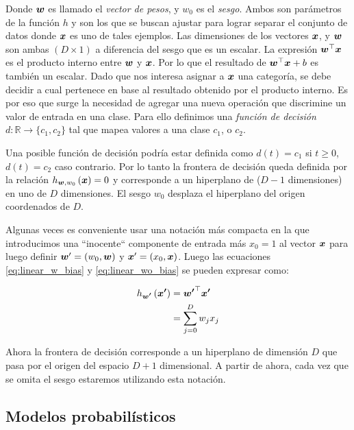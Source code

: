 Donde $\boldsymbol{w}$ es llamado el \emph{vector de pesos}, y $w_0$ es el
\emph{sesgo}. Ambos son parámetros de la función $h$ y son los que se buscan
ajustar para lograr separar el conjunto de datos donde $\boldsymbol{x}$ es uno de tales
ejemplos. Las dimensiones de los vectores $\boldsymbol{x}$, y $\boldsymbol{w}$ son ambas $(D
\times 1)$ a diferencia del sesgo que es un escalar. La expresión
$\boldsymbol{w}^{\top} \boldsymbol{x}$ es el producto interno entre $\boldsymbol{w}$ y $\boldsymbol{x}$.
Por lo que el resultado de $\boldsymbol{w}^{\top} \boldsymbol{x} + b$ es también un escalar.
Dado que nos interesa asignar a $\boldsymbol{x}$ una categoría, se debe decidir a cual
pertenece en base al resultado obtenido por el producto interno. Es por eso que
surge la necesidad de agregar una nueva operación que discrimine un valor de
entrada en una clase. Para ello definimos una \emph{función de decisión} $d: \mathbb{R} \rightarrow
\{c_1, c_2\}$ tal que mapea valores a una clase $c_1$, o $c_2$.

Una posible función de decisión podría estar definida como $d(t) = c_1$ si $t
\geq 0$, $d(t) = c_2$ caso contrario. Por lo tanto la frontera de decisión queda
definida por la relación $h_{\boldsymbol{w}, w_0}\left( \boldsymbol{x} \right) = 0$ y
corresponde a un hiperplano de ($D-1$ dimensiones) en uno de $D$ dimensiones. El
sesgo $w_0$ desplaza el hiperplano del origen coordenados de $D$.

Algunas veces es conveniente usar una notación más compacta en la que
introducimos una ``inocente`` componente de entrada más $x_0 = 1$ al vector
$\boldsymbol{x}$ para luego definir $\boldsymbol{w}' = (w_0, \boldsymbol{w})$ y $\boldsymbol{x}' = (x_0,
\boldsymbol{x})$. Luego las ecuaciones \ref{eq:linear_w_bias} y \ref{eq:linear_wo_bias}
se pueden expresar como:

\begin{align}
    h_{\boldsymbol{w'}}\left( \boldsymbol{x'} \right) &= \boldsymbol{w'}^{\top} \boldsymbol{x'}\\
                                           &= \sum_{j = 0 }^{D} w_j x_j
\end{align}

Ahora la frontera de decisión corresponde a un hiperplano de dimensión $D$ que
pasa por el origen del espacio $D + 1$ dimensional. A partir de ahora, cada vez
que se omita el sesgo estaremos utilizando esta notación.

\subsection{Modelos probabilísticos}

